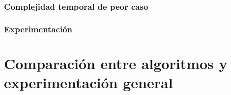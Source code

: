 \documentclass[a4paper, 10pt, twoside]{article}
\begin{document}
      \subsubsection{Complejidad temporal de peor caso}
      \label{subsub:algoritmos-heuristicos-grasp-complejidad.tex}
      

      \subsubsection{Experimentación}
      \label{subsub:algoritmos-heuristicos-grasp-experimentacion.tex}
      

\newpage



\section{Comparación entre algoritmos y experimentación general}
\label{sec:experimentacion-general}


\newpage
\end{document}
